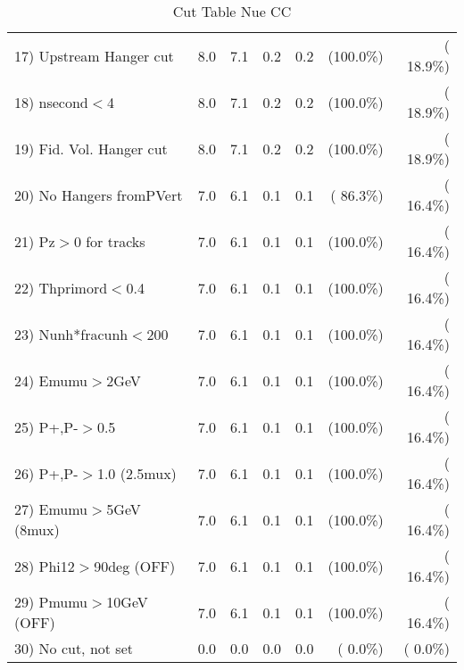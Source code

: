 \begin{table}[h!]
\begin{tabular}{||l||r|r|r|r|r|r||}
 17) Upstream Hanger cut  &          8.0 &          7.1 &          0.2 &          0.2 & (100.0\%) & ( 18.9\%) \\
 18) nsecond$<$4          &          8.0 &          7.1 &          0.2 &          0.2 & (100.0\%) & ( 18.9\%) \\
 19) Fid. Vol. Hanger cut &          8.0 &          7.1 &          0.2 &          0.2 & (100.0\%) & ( 18.9\%) \\
 20) No Hangers fromPVert &          7.0 &          6.1 &          0.1 &          0.1 & ( 86.3\%) & ( 16.4\%) \\
 21) Pz$>$0 for tracks    &          7.0 &          6.1 &          0.1 &          0.1 & (100.0\%) & ( 16.4\%) \\
 22) Thprimord$<$0.4      &          7.0 &          6.1 &          0.1 &          0.1 & (100.0\%) & ( 16.4\%) \\
 23) Nunh*fracunh$<$200   &          7.0 &          6.1 &          0.1 &          0.1 & (100.0\%) & ( 16.4\%) \\
 24) Emumu$>$2GeV         &          7.0 &          6.1 &          0.1 &          0.1 & (100.0\%) & ( 16.4\%) \\
 25) P+,P-$>$0.5          &          7.0 &          6.1 &          0.1 &          0.1 & (100.0\%) & ( 16.4\%) \\
 26) P+,P-$>$1.0 (2.5mux) &          7.0 &          6.1 &          0.1 &          0.1 & (100.0\%) & ( 16.4\%) \\
 27) Emumu$>$5GeV  (8mux) &          7.0 &          6.1 &          0.1 &          0.1 & (100.0\%) & ( 16.4\%) \\
 28) Phi12$>$90deg  (OFF) &          7.0 &          6.1 &          0.1 &          0.1 & (100.0\%) & ( 16.4\%) \\
 29) Pmumu$>$10GeV  (OFF) &          7.0 &          6.1 &          0.1 &          0.1 & (100.0\%) & ( 16.4\%) \\
 30) No cut, not set      &          0.0 &          0.0 &          0.0 &          0.0 & (  0.0\%) & (  0.0\%) \\
 \hline
 \hline
 \end{tabular}
 \caption{Cut Table   Nue CC  }
 \label{tab-cutheavy_neutrino_1.500}
 \end{table}

